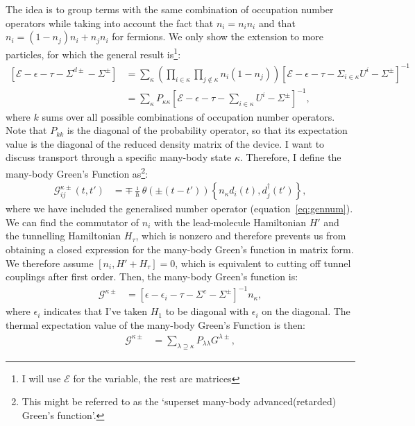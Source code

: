 The idea is to group terms with the same combination of occupation number operators while taking into account the fact that $n_i = n_i n_i$ and that $n_i = (1-n_j)n_i + n_j n_i$  for fermions. We only show the extension to more particles, for which the general result is\footnote{I will use $\mathscr{E}$ for the variable, the rest are matrices}:
\begin{align*}
\left[ \mathscr{E} - \epsilon - \tau -\Sigma^{d\pm} - \Sigma^\pm \right]  &= \sum_\kappa \left( \prod_{i\in\kappa} \prod_{j\notin\kappa} n_i (1-n_j) \right) \left[ \mathscr{E} - \epsilon -\tau - \Sigma_{i \in \kappa}U^i - \Sigma^\pm \right]^{-1} \\
&= \sum_\kappa P_{\kappa\kappa} \left[ \mathscr{E} - \epsilon - \tau - \sum_{i\in\kappa} U^i - \Sigma^\pm \right]^{-1},
\end{align*}
where $k$ sums over all possible combinations of occupation number operators. Note that $P_{kk}$ is the diagonal of the probability operator, so that its expectation value is the diagonal of the reduced density matrix of the device. I want to discuss transport through a specific many-body state $\kappa$. Therefore, I define the many-body Green's Function as\footnote{This might be referred to as the `superset many-body advanced(retarded) Green's function'.}:
\begin{align}
\mathscr{G}^{\kappa\pm}_{ij} (t,t') &= \mp \frac{\imath}{\hbar} \theta(\pm(t-t'))\left\{ n_\kappa d_i(t), d_j^\dagger (t')\right\},
\label{eq:mbgfdef}
\end{align}
where we have included the generalised number operator (equation~\ref{eq:gennum}). We can find the commutator of $n_i$ with the lead-molecule Hamiltonian $H'$ and the tunnelling Hamiltonian $H_\tau$, which is nonzero and therefore prevents us from obtaining a closed expression for the many-body Green's function in matrix form. We therefore assume $\left[ n_i, H' + H_\tau \right]=0$, which is equivalent to cutting off tunnel couplings after first order. Then, the many-body Green's function is:
\begin{align}
\mathscr{G}^{\kappa\pm} &= \left[ \epsilon - \epsilon_i - \tau - \Sigma^c - \Sigma^\pm\right]^{-1} n_\kappa,
\label{eq:mbgfmatrix}
\end{align}
where $\epsilon_i$ indicates that I've taken $H_1$ to be diagonal with $\epsilon_i$ on the diagonal. The thermal expectation value of the many-body Green's Function is then:
\begin{align}
\mathscr{G}^{\kappa\pm} &= \sum_{\lambda\supseteq\kappa} P_{\lambda\lambda} G^{\lambda\pm},\label{eq:mbgfresult}
\end{align}

